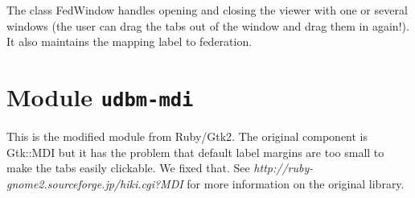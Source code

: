 \documentclass[a4paper]{report}
\begin{document}
The class FedWindow handles opening and closing the viewer with one
or several windows (the user can drag the tabs out of the window and
drag them in again!). It also maintains the mapping label to
federation. 

\section{Module {\tt udbm-mdi}}

This is the modified module from Ruby/Gtk2. The original component is
Gtk::MDI but it has the problem that default label margins are too
small to make the tabs easily clickable. We fixed that. See {\em
http://ruby-gnome2.sourceforge.jp/hiki.cgi?MDI} for more information
on the original library.





\newpage
\label{INDEX}
\printindex
\end{document}
